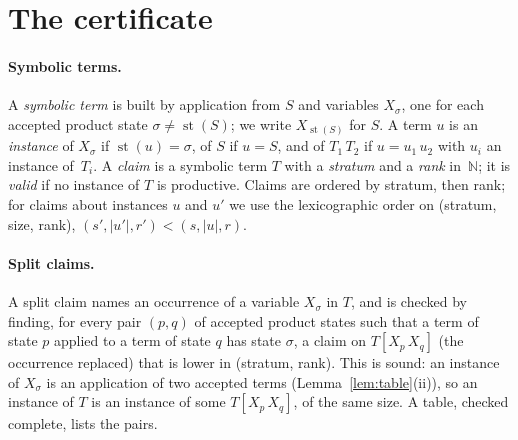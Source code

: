 \documentclass[11pt]{amsart}
\theoremstyle{definition}
\theoremstyle{remark}
\newcommand{\sz}[1]{|#1|}
\newcommand{\st}{\operatorname{st}}
\begin{document}
\section{The certificate}\label{sec:cert}

\paragraph{Symbolic terms.} A \emph{symbolic term} is built by application from $S$ and
variables $X_\sigma$, one for each accepted product state $\sigma\ne\st(S)$; we write $X_{\st(S)}$ for $S$. A term $u$ is
an \emph{instance} of $X_\sigma$ if $\st(u)=\sigma$, of $S$ if $u=S$, and of $T_1\,T_2$ if
$u=u_1\,u_2$ with $u_i$ an instance of~$T_i$. A \emph{claim} is a symbolic term $T$ with a
\emph{stratum} and a \emph{rank} in~$\mathbb N$; it is \emph{valid} if no instance of $T$
is productive. Claims are ordered by stratum, then rank; for claims about instances
$u$ and $u'$ we use the lexicographic order on (stratum, size, rank),
$(s',\sz{u'},r')<(s,\sz u,r)$.

\paragraph{Split claims.} A split claim names an occurrence of a variable $X_\sigma$ in
$T$, and is checked by finding, for every pair $(p,q)$ of accepted product states such that
a term of state $p$ applied to a term of state $q$ has state $\sigma$, a claim on $T[X_p\,X_q]$ (the occurrence replaced) that is lower in
(stratum, rank). This is sound: an instance of $X_\sigma$ is an application of two
accepted terms (Lemma~\ref{lem:table}(ii)), so an instance of $T$ is an instance of
some $T[X_p\,X_q]$, of the same size. A table, checked complete, lists the pairs.
\end{document}
